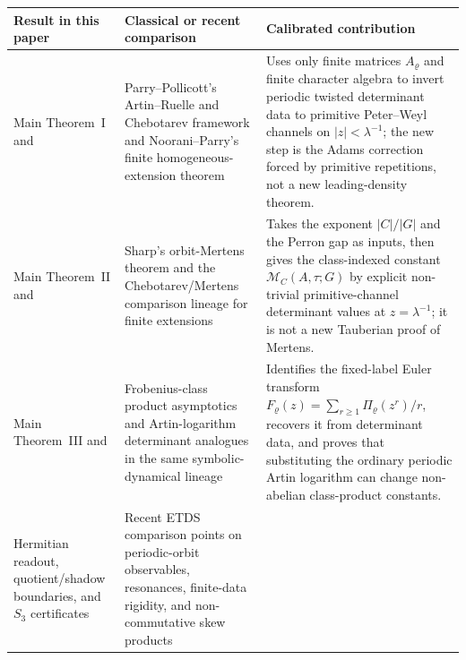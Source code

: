 \documentclass[11pt,a4paper]{amsart}
\theoremstyle{plain}
\theoremstyle{definition}
\theoremstyle{remark}
\begin{document}
\begin{table}[t]
  \centering
  \footnotesize
  \begin{tabular}{L{0.21\textwidth}L{0.34\textwidth}L{0.36\textwidth}}
    \toprule
    Result in this paper & Classical or recent comparison & Calibrated contribution \\
    \midrule
    Main Theorem~I and
      & Parry--Pollicott's Artin--Ruelle and Chebotarev framework and
        Noorani--Parry's finite homogeneous-extension theorem
        \cite{ParryPollicott1990Zeta,ParryPollicott1986Chebotarev,NooraniParry1992ChebotarevShifts}
      & Uses only finite matrices \(A_\varrho\) and finite character algebra to
        invert periodic twisted determinant data to primitive Peter--Weyl
        channels on \(|z|<\lambda^{-1}\); the new step is the Adams correction
        forced by primitive repetitions, not a new leading-density theorem. \\
    Main Theorem~II and
      & Sharp's orbit-Mertens theorem and the Chebotarev/Mertens comparison
        lineage for finite extensions
        \cite{Sharp1991Mertens,ParryPollicott1986Chebotarev,NooraniParry1992ChebotarevShifts,MeslizaNoorani1999FrobeniusMertens}
      & Takes the exponent \(|C|/|G|\) and the Perron gap as inputs, then gives
        the class-indexed constant \(\mathcal M_C(A,\tau;G)\) by explicit
        non-trivial primitive-channel determinant values at
        \(z=\lambda^{-1}\); it is not a new Tauberian proof of Mertens. \\
    Main Theorem~III and
      & Frobenius-class product asymptotics and Artin-logarithm determinant
        analogues in the same symbolic-dynamical lineage
        \cite{MeslizaNoorani1999FrobeniusMertens,ParryPollicott1990Zeta}
      & Identifies the fixed-label Euler transform
        \(F_\varrho(z)=\sum_{r\ge1}\Pi_\varrho(z^r)/r\), recovers it from
        determinant data, and proves that substituting the ordinary periodic
        Artin logarithm can change non-abelian class-product constants. \\
    Hermitian readout, quotient/shadow boundaries, and \(S_3\) certificates
      & Recent ETDS comparison points on periodic-orbit observables,
        resonances, finite-data rigidity, and non-commutative skew products

\end{tabular}
\end{table}
\end{document}
